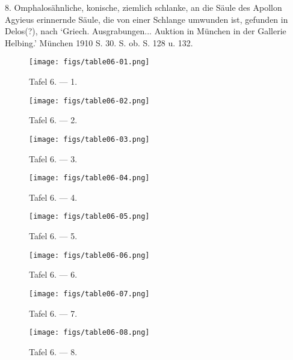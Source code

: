 \documentclass[a4paper, 11pt, oneside]{article}
\begin{document}
8. Omphalosähnliche, konische, ziemlich schlanke, an die Säule des Apollon Agyieus erinnernde Säule, die von einer Schlange umwunden ist, gefunden in Delos(?), nach `Griech. Ausgrabungen... Auktion in München in der Gallerie Helbing.' München 1910 S. 30. S. ob. S. 128 u. 132.
\clearpage
\vspace*{\fill}
\begin{figure}[H]
\centering
\texttt{[image: figs/table06-01.png]}
\caption{Tafel 6. --- 1.}
\end{figure}
\vspace*{\fill}
\clearpage
\vspace*{\fill}
\begin{figure}[H]
\centering
\texttt{[image: figs/table06-02.png]}
\caption{Tafel 6. --- 2.}
\end{figure}
\vspace*{\fill}
\clearpage
\vspace*{\fill}
\begin{figure}[H]
\centering
\texttt{[image: figs/table06-03.png]}
\caption{Tafel 6. --- 3.}
\end{figure}
\vspace*{\fill}
\clearpage
\vspace*{\fill}
\begin{figure}[H]
\centering
\texttt{[image: figs/table06-04.png]}
\caption{Tafel 6. --- 4.}
\end{figure}
\vspace*{\fill}
\clearpage
\vspace*{\fill}
\begin{figure}[H]
\centering
\texttt{[image: figs/table06-05.png]}
\caption{Tafel 6. --- 5.}
\end{figure}
\vspace*{\fill}
\clearpage
\vspace*{\fill}
\begin{figure}[H]
\centering
\texttt{[image: figs/table06-06.png]}
\caption{Tafel 6. --- 6.}
\end{figure}
\vspace*{\fill}
\clearpage
\vspace*{\fill}
\begin{figure}[H]
\centering
\texttt{[image: figs/table06-07.png]}
\caption{Tafel 6. --- 7.}
\end{figure}
\vspace*{\fill}
\clearpage
\vspace*{\fill}
\begin{figure}[H]
\centering
\texttt{[image: figs/table06-08.png]}
\caption{Tafel 6. --- 8.}
\end{figure}
\vspace*{\fill}
\clearpage
\end{document}
